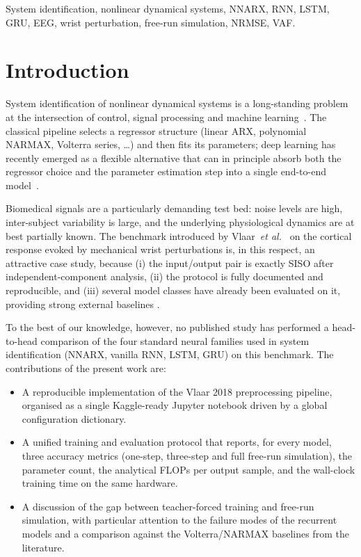 \documentclass[conference]{IEEEtran}
\begin{document}
\begin{IEEEkeywords}
System identification, nonlinear dynamical systems, NNARX, RNN, LSTM,
GRU, EEG, wrist perturbation, free-run simulation, NRMSE, VAF.
\end{IEEEkeywords}

\section{Introduction}

System identification of nonlinear dynamical systems is a long-standing
problem at the intersection of control, signal processing and machine
learning~\cite{Ljung1999,Nelles2001,Sjoberg1995}. The classical pipeline
selects a regressor structure (linear ARX, polynomial NARMAX, Volterra
series, \dots) and then fits its parameters; deep learning has recently
emerged as a flexible alternative that can in principle absorb both the
regressor choice and the parameter estimation step into a single
end-to-end model~\cite{Andersson2019,Forgione2021}.

Biomedical signals are a particularly demanding test bed: noise levels
are high, inter-subject variability is large, and the underlying
physiological dynamics are at best partially known. The benchmark
introduced by Vlaar~\textit{et al.}~\cite{Vlaar2018} on the
cortical response evoked by mechanical wrist perturbations is, in this
respect, an attractive case study, because (i) the input/output pair is
exactly SISO after independent-component analysis, (ii) the protocol is
fully documented and reproducible, and (iii) several model classes have
already been evaluated on it, providing strong external baselines
\cite{Vlaar2018,Gu2018,Gu2021,Santos2023}.

To the best of our knowledge, however, no published study has performed
a head-to-head comparison of the four standard neural families used in
system identification (NNARX, vanilla RNN, LSTM, GRU) on this benchmark.
The contributions of the present work are:
\begin{itemize}
    \item A reproducible implementation of the Vlaar 2018
          preprocessing pipeline, organised as a single Kaggle-ready
          Jupyter notebook driven by a global configuration
          dictionary.
    \item A unified training and evaluation protocol that reports,
          for every model, three accuracy metrics (one-step, three-step
          and full free-run simulation), the parameter count, the
          analytical FLOPs per output sample, and the wall-clock training
          time on the same hardware.
    \item A discussion of the gap between teacher-forced training and
          free-run simulation, with particular attention to the failure
          modes of the recurrent models and a comparison against the
          Volterra/NARMAX baselines from the literature.
\end{itemize}
\end{document}
